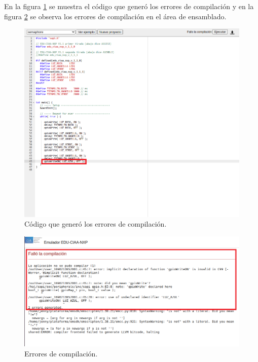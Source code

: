 En la figura \ref{fig:PlataformaErrores2} se muestra el código que generó los errores de compilación y en la figura \ref{fig:PlataformaErrores1} se observa los errores de compilación en el área de ensamblado.




\begin{figure}[ht]
	\centering
	\includegraphics[scale=.46]{./Figures/PlataformaErrores1.png}
	\caption{Código que generó los errores de compilación.}
	\label{fig:PlataformaErrores2}
\end{figure}




\begin{figure}[ht]
	\centering
	\includegraphics[scale=.46]{./Figures/PlataformaErrores2.png}
	\caption{Errores de compilación.}
	\label{fig:PlataformaErrores1}
\end{figure}

